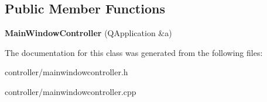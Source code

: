 \subsection*{Public Member Functions}
\begin{DoxyCompactItemize}
\item 
\hypertarget{classMainWindowController_a123ba7b98ffb51986b1d42e552c21762}{{\bfseries Main\+Window\+Controller} (Q\+Application \&a)}\label{classMainWindowController_a123ba7b98ffb51986b1d42e552c21762}

\end{DoxyCompactItemize}


The documentation for this class was generated from the following files\+:\begin{DoxyCompactItemize}
\item 
controller/mainwindowcontroller.\+h\item 
controller/mainwindowcontroller.\+cpp\end{DoxyCompactItemize}
